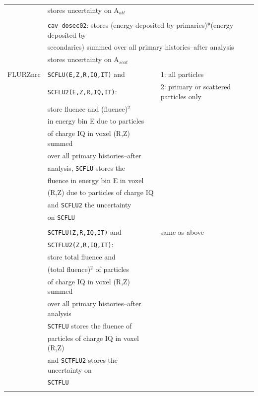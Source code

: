 \documentclass[12pt,twoside]{article}  %
\begin{document}
\begin{longtable}{lll}
         & \multicolumn{2}{l}{stores uncertainty on A$_{att}$}\\
         &&\\
         & \multicolumn{2}{l}{{\tt cav\_dosec02}: stores (energy deposited by primaries)*(energy deposited by}\\
         & \multicolumn{2}{l}{secondaries) summed over all primary histories--after analysis}\\
         & \multicolumn{2}{l}{stores uncertainty on A$_{scat}$}\\
         &          &\\
FLURZnrc & {\tt SCFLU(E,Z,R,IQ,IT)} and & 1: all particles\\
         & {\tt SCFLU2(E,Z,R,IQ,IT)}: & 2: primary or scattered particles only\\
         & store fluence and (fluence)$^2$ &\\
         & in energy bin E due to particles &\\
         & of charge IQ in voxel (R,Z) summed &\\
         & over all primary histories--after &\\
         & analysis, {\tt SCFLU} stores the &\\
         & fluence in energy bin E in voxel &\\
         & (R,Z) due to particles of charge IQ&\\
         & and {\tt SCFLU2} the uncertainty &\\
         & on {\tt SCFLU} &\\
         &&\\
         & {\tt SCTFLU(Z,R,IQ,IT)} and & same as above\\
         & {\tt SCTFLU2(Z,R,IQ,IT)}: &\\
         & store total fluence and &\\
         & (total fluence)$^2$ of particles &\\
         & of charge IQ in voxel (R,Z) summed &\\
         & over all primary histories--after analysis&\\
         & {\tt SCTFLU} stores the fluence of &\\
         & particles of charge IQ in voxel (R,Z) &\\
         & and {\tt SCTFLU2} stores the uncertainty on&\\
         & {\tt SCTFLU}&\\
         &&\\

\end{longtable}
\end{document}
